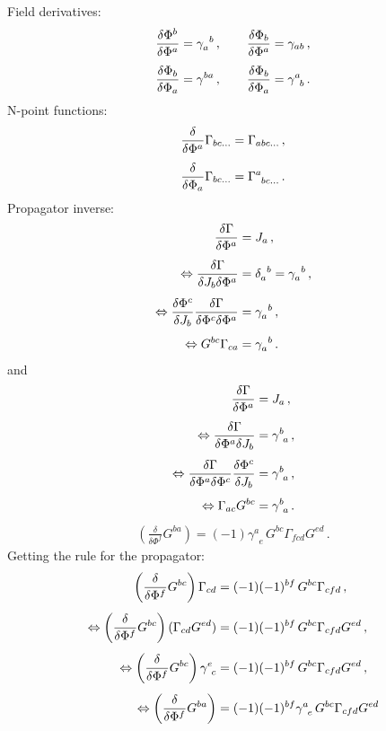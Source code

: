 \documentclass[10pt,prd,nofootinbib,superscriptaddress,twocolumn]{revtex4-2}
\begin{document}
Field derivatives:
%
\begin{align}
	\frac{\delta \Phi^b}{\delta \Phi^a} &= \gamma_a^{\phantom{a}b}
	\,,\qquad
	\frac{\delta \Phi_b}{\delta \Phi^a} = \gamma_{ab}
	\,,\notag\\[1ex]
	\frac{\delta \Phi_b}{\delta \Phi_a} &= \gamma^{ba}
	\,,\qquad
	\frac{\delta \Phi_b}{\delta \Phi_a} = \gamma^{a}_{\phantom{a}b}
	\,.
\end{align}
%
N-point functions:
%
\begin{align}
	\frac{\delta }{\delta \Phi^a} \Gamma_{bc\ldots} = \Gamma_{abc\ldots}
	\,,\notag\\[1ex]
	\frac{\delta }{\delta \Phi_a} \Gamma_{bc\ldots} = \Gamma^{a}_{\phantom{a}bc\ldots}
	\,.
\end{align}
%
Propagator inverse:
%
\begin{align}
	\frac{\delta \Gamma}{\delta \Phi^a} &= J_a
	\,,\notag\\[1ex]\Leftrightarrow 
	\frac{\delta \Gamma}{\delta J_b\delta \Phi^a} &= \delta_a^{\phantom{a}b} = \gamma_a^{\phantom{a}b}
	\,,\notag\\[1ex]\Leftrightarrow 
	\frac{\delta \Phi^c}{\delta J_b}\frac{\delta \Gamma}{\delta \Phi^c\delta \Phi^a} &= \gamma_a^{\phantom{a}b}
	\,,\notag\\[1ex]\Leftrightarrow 
	G^{bc}\Gamma_{ca} &= \gamma_a^{\phantom{a}b}
	\,.
\end{align}
%
and
%
\begin{align}
	\frac{\delta \Gamma}{\delta \Phi^a} &= J_a
	\,,\notag\\[1ex]\Leftrightarrow 
	\frac{\delta \Gamma}{\delta \Phi^a\delta J_b} &= \gamma^b_{\phantom{b}a}
	\,,\notag\\[1ex]\Leftrightarrow 
	\frac{\delta \Gamma}{\delta \Phi^a\delta \Phi^c}\frac{\delta \Phi^c}{\delta J_b} &= \gamma^b_{\phantom{b}a}
	\,,\notag\\[1ex]\Leftrightarrow 
	\Gamma_{ac}G^{bc} &= \gamma^b_{\phantom{b}a}
	\,.
\end{align}
%
%
\begin{align}
	\left(\frac{\delta}{\delta \Phi^f}G^{ba}\right)= (-1)\gamma^a_{\phantom{a}e}\, G^{bc}\Gamma_{fcd}G^{ed}
	\,.
\end{align}
%
Getting the rule for the propagator:
%
\begin{align}
	\left(\frac{\delta}{\delta \Phi^f}G^{bc}\right)\Gamma_{cd} &= (-1)(-1)^{bf}\,G^{bc}\Gamma_{cfd}
	\,,\notag\\[1ex]
	\Leftrightarrow\left(\frac{\delta}{\delta \Phi^f}G^{bc}\right)(\Gamma_{cd}G^{ed}) &= (-1)(-1)^{bf}\,G^{bc}\Gamma_{cfd}G^{ed}
	\,,\notag\\[1ex]
	\Leftrightarrow\left(\frac{\delta}{\delta \Phi^f}G^{bc}\right)\gamma^e_{\phantom{e}c} &= (-1)(-1)^{bf}\,G^{bc}\Gamma_{cfd}G^{ed}
	\,,\notag\\[1ex]
	\Leftrightarrow\left(\frac{\delta}{\delta \Phi^f}G^{ba}\right) &= (-1)(-1)^{bf}\gamma^a_{\phantom{a}e}\, G^{bc}\Gamma_{cfd}G^{ed}
\end{align}
\end{document}
